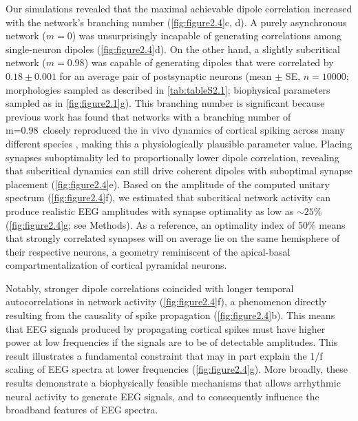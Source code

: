 Our simulations revealed that the maximal achievable dipole correlation increased with the network’s branching number (\autoref{fig:figure2.4}c, d). A purely asynchronous network ($m=0$) was unsurprisingly incapable of generating correlations among single-neuron dipoles (\autoref{fig:figure2.4}d). On the other hand, a slightly subcritical network ($m=0.98$) was capable of generating dipoles that were correlated by $0.18 \pm 0.001$ for an average pair of postsynaptic neurons (mean $\pm$ SE, $n=10000$; morphologies sampled as described in \autoref{tab:tableS2.1}; biophysical parameters sampled as in \autoref{fig:figure2.1}g). This branching number is significant because previous work has found that networks with a branching number of m=0.98\ closely reproduced the in vivo dynamics of cortical spiking across many different species \cite{Suryadi2022, Wilting2019}, making this a physiologically plausible parameter value. Placing synapses suboptimality led to proportionally lower dipole correlation, revealing that subcritical dynamics can still drive coherent dipoles with suboptimal synapse placement (\autoref{fig:figure2.4}e). Based on the amplitude of the computed unitary spectrum (\autoref{fig:figure2.4}f), we estimated that subcritical network activity can produce realistic EEG amplitudes with synapse optimality as low as ${\sim}25$\% (\autoref{fig:figure2.4}g; see Methods). As a reference, an optimality index of 50\% means that strongly correlated synapses will on average lie on the same hemisphere of their respective neurons, a geometry reminiscent of the apical-basal compartmentalization of cortical pyramidal neurons. 

Notably, stronger dipole correlations coincided with longer temporal autocorrelations in network activity (\autoref{fig:figure2.4}f), a phenomenon directly resulting from the causality of spike propagation (\autoref{fig:figure2.4}b). This means that EEG signals produced by propagating cortical spikes must have higher power at low frequencies if the signals are to be of detectable amplitudes. This result illustrates a fundamental constraint that may in part explain the 1/f scaling of EEG spectra at lower frequencies (\autoref{fig:figure2.4}g). More broadly, these results demonstrate a biophysically feasible mechanisms that allows arrhythmic neural activity to generate EEG signals, and to consequently influence the broadband features of EEG spectra.

